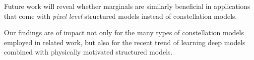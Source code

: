 \documentclass[10pt,twocolumn,letterpaper]{article}
\begin{document}
Future work will reveal whether marginals are similarly beneficial in applications that come with \emph{pixel level} structured models instead of constellation models.

Our findings are of impact not only for the many types of constellation models employed in related work, but also for the recent trend of learning deep models combined with physically motivated structured models. 

{\small


}
\end{document}
